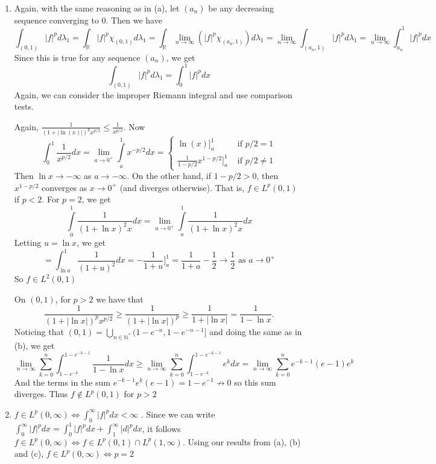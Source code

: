 \documentclass[letterpaper, 11pt]{article}
\newcommand{\1}{\mathds{1}}	%
\theoremstyle{definition}
\begin{document}
\begin{enumerate}
	\item[(c)] Again, with the same reasoning as in (a), let $(a_n)$ be any decreasing sequence converging to $0$. Then we have \[
	\int _{(0,1)} |f|^p d \lambda _1 = \int _\mathbb{R} |f|^p \chi _{(0,1)} d \lambda _1 = \int _{\mathbb{R}} \lim \limits _{n \to \infty} (|f|^p \chi _{(a_n, 1)}) d\lambda _1 = \lim \limits _{n \to \infty} \int _{(a_n, 1)} |f|^p d \lambda _1 = \lim \limits _{n \to \infty} \int _{a_n} ^1 |f|^p dx
	\]
	Since this is true for any sequence $(a_n)$, we get \[
	\int _{(0,1)} |f|^p d \lambda _1 = \int _0 ^1 |f|^p dx
	\]
	Again, we can consider the improper Riemann integral and use comparison tests.
	
Again,  $\frac{1}{(1+|\ln (x)|)^p x^{p/2}} \le \frac{1}{x^{p/2}}$. Now \[
	\int _0 ^1 \frac{1}{x^{p/2}}dx = \lim \limits _{a \to 0^+} \int \limits _a^1 x^{-p/2}dx = \begin{cases} \ln (x) \bigg ] _a ^1 & \text{ if } p/2 = 1 \\ \frac{1}{1-p/2} x^{1-p/2} \bigg ] _a ^1 & \text{ if } p/2 \ne 1\end{cases}
	\]
	Then $\ln x \to -\infty$ as $a \to -\infty$. On the other hand, if $1-p/2 > 0$, then $x^{1-p/2} $ converges as $x \to 0^+$ (and diverges otherwise). That is, $f \in L^p(0,1)$ if $p<2$. For $p=2$, we get 
	 \[
	\int \limits _{0} ^1 \frac{1}{(1+\ln x)^2 x} dx  = \lim \limits _{a \to 0^+} \int \limits _a ^1 \frac{1}{(1+\ln x)^2 x}dx
	\]
	Letting $u = \ln x$, we get \[
	= \int _{\ln a} ^{1} \frac{1}{(1+u)^2}dx = - \frac{1}{1+u} \bigg ]_a^ {1} = \frac{1}{1+a}- \frac{1}{2} \to \frac{1}{2} \text{ as } a\to 0^+
	\]
	So $f \in L^2(0, 1)$
	
	On $(0,1)$, for $p > 2$ we have that \[
	\frac{1}{(1+|\ln x|)^p x^{p/2}} \ge \frac{1}{(1+|\ln x|)^p} \ge \frac{1}{1+| \ln x|} = \frac{1}{1-\ln x}. 
	\]
	Noticing that $(0,1) = \bigcup \limits _{n \in \mathbb{N}^*}(1-e^{-n}, 1-e^{-n-1}]$ and doing the same as in (b), we get
	\[
	 \lim \limits _{n \to \infty} \sum \limits _{k=0}^n \int _{1-e^{-k}}^{1-e^{-k-1}} \frac{1}{1-\ln x}dx \ge  \lim \limits _{n \to \infty} \sum \limits _{k=0}^n \int _{1-e^{-k}}^{1-e^{-k-1}} e^kdx = \lim \limits _{n \to \infty} \sum \limits _{k=0}^n e^{-k-1}(e-1)e^k
	\]
	And the terms in the sum $e^{-k-1}e^k(e-1) = 1-e^{-1} \not \to 0$ so this sum diverges. Thus $f \notin L^p(0,1)$ for $p > 2$
	
	\item [(d)] $f \in L^p(0,\infty) \iff \int _0 ^ \infty |f|^p dx < \infty$ . Since we can write $\int _0^ \infty |f|^p dx = \int _0 ^1 |f|^p dx + \int _1 ^\infty |d|^pdx$, it follows $f \in L^p(0, \infty) \iff f \in L^p(0,1) \cap L^p(1, \infty)$. Using our results from (a), (b) and (c), $f \in L^p(0, \infty) \iff p = 2$
\end{enumerate}
\end{document}
